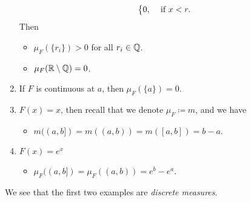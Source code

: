 \begin{eg}
\begin{enumerate}
\[\begin{dcases}
				      0, & \text{ if } x<r.       \\
			      \end{dcases}
		      \]
		      Then
		      \begin{itemize}
			      \item \(\mu _F(\{r_{i}\})>0\) for all \(r_{i}\in\mathbb{\MakeUppercase{q}} \).
			      \item \(\mu _F(\mathbb{\MakeUppercase{r}} \setminus \mathbb{\MakeUppercase{q}} ) = 0\).
		      \end{itemize}
		\item If \(F\) is continuous at \(a\), then \(\mu _F(\{a\}) = 0\).
		\item \(F(x) = x\), then recall that we denote \(\mu _F \coloneqq m\), and we have
		      \begin{itemize}
			      \item \( m((a, b]) = m((a, b)) = m([a, b]) = b - a\).
		      \end{itemize}
		\item \(F(x) = e^x\)
		      \begin{itemize}
			      \item \(\mu _F((a, b]) = \mu _F((a, b)) = e^b - e^a\).
		      \end{itemize}
	\end{enumerate}
	\begin{remark}
		We see that the first two examples are \emph{discrete measures}.
	\end{remark}
\end{eg}

